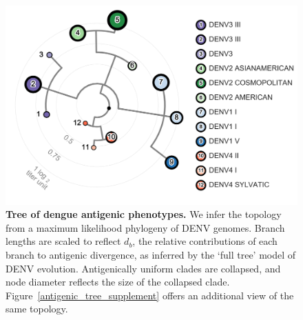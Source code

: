 \documentclass[11pt,oneside,letterpaper]{article}
\begin{document}
\begin{figure}[h]
  \begin{centering}
    \includegraphics[width=\linewidth]{../figures/png/antigenic_tree.png}
    \caption{\textbf{Tree of dengue antigenic phenotypes.}
    We infer the topology from a maximum likelihood phylogeny of DENV genomes.
    Branch lengths are scaled to reflect $d_b$, the relative contributions of each branch to antigenic divergence, as inferred by the `full tree' model of DENV evolution.
    Antigenically uniform clades are collapsed, and node diameter reflects the size of the collapsed clade.
    Figure~\ref{antigenic_tree_supplement} offers an additional view of the same topology.
    }
     \label{antigenic_tree}
  \end{centering}
\end{figure}
\end{document}
